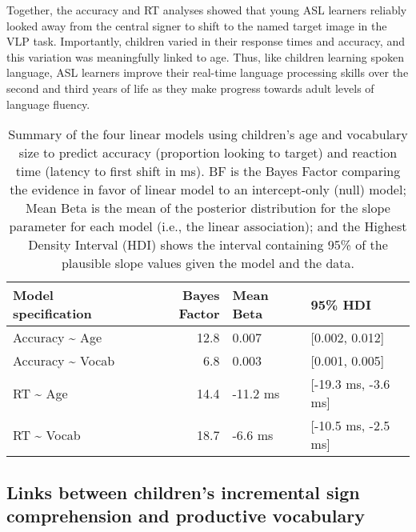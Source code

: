 \documentclass[oneside]{report}
\begin{document}
Together, the accuracy and RT analyses showed that young ASL learners
reliably looked away from the central signer to shift to the named
target image in the VLP task. Importantly, children varied in their
response times and accuracy, and this variation was meaningfully linked
to age. Thus, like children learning spoken language, ASL learners
improve their real-time language processing skills over the second and
third years of life as they make progress towards adult levels of
language fluency.
\begin{longtable}[t]{>{\raggedright\arraybackslash}p{4cm}rll}
\caption[Summary of the four linear models using children's age and vocabulary size to predict accuracy and reaction time]{\label{tab:sol-bf-table}Summary of the four linear models using children's age and vocabulary size to predict accuracy (proportion looking to target) and reaction time (latency to first shift in ms). BF is the Bayes Factor comparing the evidence in favor of linear model to an intercept-only (null) model; Mean Beta is the mean of the posterior distribution for the slope parameter for each model (i.e., the linear association); and the Highest Density Interval (HDI) shows the interval containing 95\% of the plausible slope values given the model and the data.}\\
\toprule
\textbf{Model specification} & \textbf{Bayes Factor} & \textbf{Mean Beta} & \textbf{95\% HDI}\\
\midrule
Accuracy \textasciitilde{} Age & 12.8 & 0.007 & [0.002, 0.012]\\
Accuracy \textasciitilde{} Vocab & 6.8 & 0.003 & [0.001, 0.005]\\
RT \textasciitilde{} Age & 14.4 & -11.2 ms & [-19.3 ms, -3.6 ms]\\
RT \textasciitilde{} Vocab & 18.7 & -6.6 ms & [-10.5 ms, -2.5 ms]\\
\bottomrule
\end{longtable}
\subsection{Links between children's incremental sign comprehension and
productive
vocabulary}\label{links-between-childrens-incremental-sign-comprehension-and-productive-vocabulary}
\end{document}
